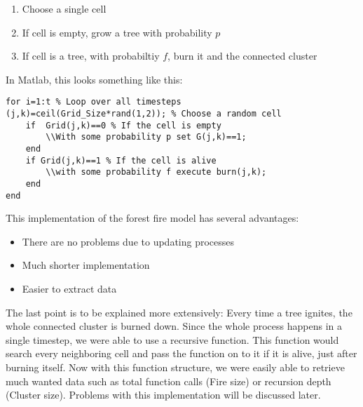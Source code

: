 \documentclass[11pt]{article}
\begin{document}
\begin{enumerate}
\item Choose a single cell
\item If cell is empty, grow a tree with probability $p$
\item If cell is a tree, with probabiltiy $f$, burn it and the connected cluster
\end{enumerate}
In Matlab, this looks something like this:
\begin{verbatim}
for i=1:t % Loop over all timesteps
(j,k)=ceil(Grid_Size*rand(1,2)); % Choose a random cell
	if  Grid(j,k)==0 % If the cell is empty
		\\With some probability p set G(j,k)==1;
	end
	if Grid(j,k)==1 % If the cell is alive
		\\with some probability f execute burn(j,k);
	end
end
\end{verbatim}

This implementation of the forest fire model has several advantages:
\begin{itemize}
\item There are no problems due to updating processes
\item Much shorter implementation
\item Easier to extract data
\end{itemize}
The last point is to be explained more extensively: Every time a tree ignites, the whole connected cluster is burned down. Since the whole process happens in a single timestep, we were able to use a recursive function. This function would search every neighboring cell and pass the function on to it if it is alive, just after burning itself. Now with this function structure, we were easily able to retrieve much wanted data such as total function calls (Fire size) or recursion depth (Cluster size). Problems with this implementation will be discussed later.
\end{document}

